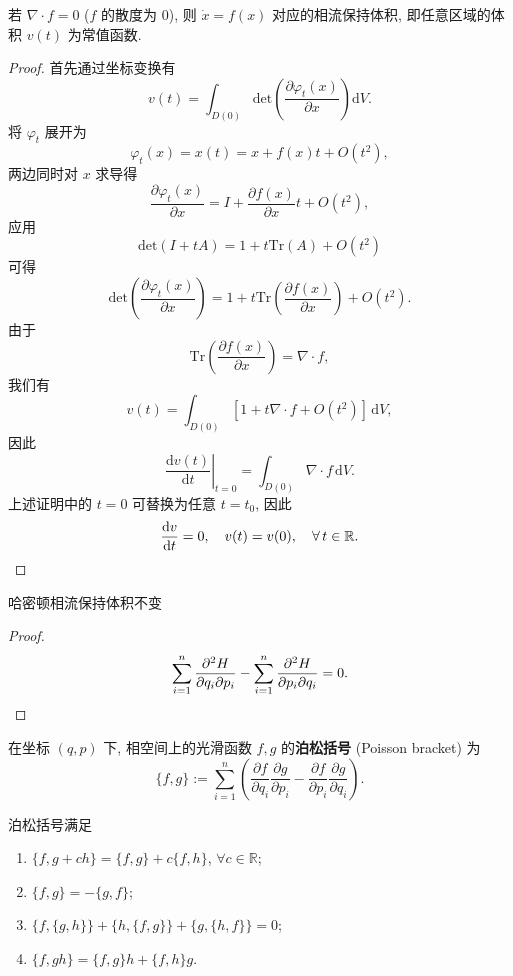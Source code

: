 \begin{theorem}
    若 $ \nabla\cdot f=0 $ ($f$ 的散度为 $0$), 则 $\dot{x}=f(x)$ 对应的相流保持体积, 即任意区域的体积 $v(t)$ 为常值函数.
\end{theorem}

\begin{proof}
    首先通过坐标变换有
    \[ v(t)=\int_{D(0)}\mathrm{det}\left( \frac{\partial\varphi_t(x)}{\partial x} \right)\mathrm{d}V. \]
    将 $ \varphi_t $ 展开为
    \[ \varphi_t(x)=x(t)=x+f(x)t+O(t^2), \]
    两边同时对 $ x $ 求导得
    \[ \frac{\partial\varphi_t(x)}{\partial x} = I+\frac{\partial f(x)}{\partial x}t+O(t^2), \]
    应用
    \[ \mathrm{det}(I+tA)=1+t\mathrm{Tr}(A)+O(t^2) \]
    可得
    \[ \mathrm{det}\left( \frac{\partial\varphi_t(x)}{\partial x} \right)=1+t\mathrm{Tr}\left( \frac{\partial f(x)}{\partial x} \right)+O(t^2). \]
    由于
    \[ \mathrm{Tr}\left( \frac{\partial f(x)}{\partial x} \right)=\nabla\cdot f, \]
    我们有
    \[ v(t)=\int_{D(0)}\left[ 1+t\nabla\cdot f+O(t^2) \right]\,\mathrm{d}V, \]
    因此
    \[ \left.\frac{\mathrm{d}v(t)}{\mathrm{d}t}\right|_{t=0}=\int_{D(0)}\nabla\cdot f\,\mathrm{d}V. \]
    上述证明中的 $ t=0 $ 可替换为任意 $ t=t_0 $, 因此 
    \[ \frac{\mathrm{d}v}{\mathrm{d}t}=0,\quad v(t)=v(0),\quad\forall t\in\mathbb{R}.\qedhere \]
\end{proof}

\begin{corollary}[刘维尔定理]
    哈密顿相流保持体积不变
\end{corollary}
\begin{proof}\keepline
    \[ \sum_{i=1}^{n}\frac{\partial^2 H}{\partial q_i\partial p_i}-\sum_{i=1}^{n}\frac{\partial^2 H}{\partial p_i\partial q_i}=0.\qedhere \]
\end{proof}

\begin{definition}[泊松括号]
    在坐标 $ (q,p) $ 下, 相空间上的光滑函数 $f,g$ 的{\bf 泊松括号} (Poisson bracket) 为
    \[ \{f,g\}:=\sum_{i=1}^{n}\left( \frac{\partial f}{\partial q_i}\frac{\partial g}{\partial p_i}-\frac{\partial f}{\partial p_i}\frac{\partial g}{\partial q_i} \right). \]
\end{definition}

\begin{proposition}
    泊松括号满足
    \begin{enumerate}
        \item $ \{f,g+ch\}=\{f,g\}+c\{f,h\} $, $ \forall c\in\mathbb{R} $;
        \item $ \{f,g\}=-\{g,f\} $;
        \item $ \{f,\{g,h\}\}+\{h,\{f,g\}\}+\{g,\{h,f\}\}=0 $;
        \item $ \{f,gh\}=\{f,g\}h+\{f,h\}g $.
    \end{enumerate}
\end{proposition}

